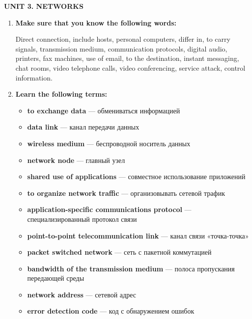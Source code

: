 \documentclass[a4paper]{article}
\def\ruleftquote{«}
\def\rurightquote{»}
\newcommand\ruquote[1]{\ruleftquote #1\rurightquote}
\newcommand\indenton{\setlength\parindent{1.25cm}}
\begin{document}
\noindent\textbf{UNIT 3. NETWORKS}

\vspace{2ex}

\def\bfitem#1{\item \textbf{#1}}

\begin{enumerate}[label={\textbf{\Roman*.}},leftmargin=0pt,itemindent=*]
  \indenton
  \bfitem{Make sure that you know the following words:}

    Direct connection, include hosts, personal computers, differ in, to carry
    signals, transmission medium, communication protocols, digital audio,
    printers, fax machines, use of email, to the destination, instant messaging,
    chat rooms, video telephone calls, video conferencing, service attack,
    control information.

  \vspace{2ex}

  \bfitem{Learn the following terms:}

  \begin{itemize}
    \item \textbf{to exchange data} --- обмениваться информацией
    \item \textbf{data link} --- канал передачи данных
    \item \textbf{wireless medium} --- беспроводной носитель данных
    \item \textbf{network node} --- главный узел

    \item \textbf{shared use of applications} --- совместное использование
      приложений

    \item \textbf{to organize network traffic} --- организовывать сетевой трафик

    \item \textbf{application-specific communications protocol} ---
      специализированный протокол связи

    \item \textbf{point-to-point telecommunication link} --- канал связи
      \ruquote{точка-точка}

    \item \textbf{packet switched network} --- сеть с пакетной коммутацией

    \item \textbf{bandwidth of the transmission medium} --- полоса пропускания
      передающей среды

    \item \textbf{network address} --- сетевой адрес
    \item \textbf{error detection code} --- код с обнаружением ошибок


\end{itemize}
\end{enumerate}
\end{document}
